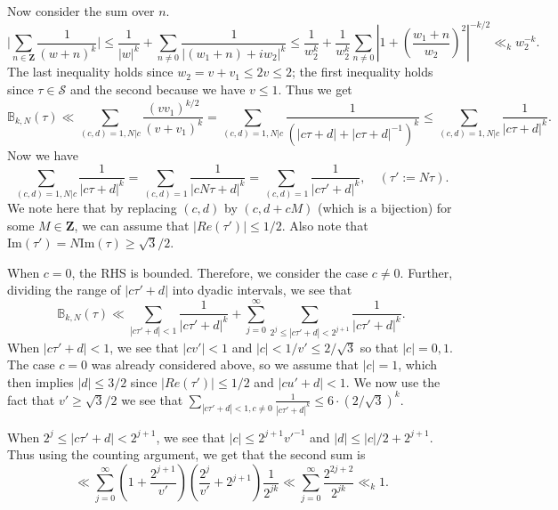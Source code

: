 \documentclass[11pt]{amsart}
\numberwithin{equation}{section}
\theoremstyle{plain}
\theoremstyle{definition}
\newcommand{\mbb}{\mathbb}
\newcommand{\mf}{\mathbf}
\newcommand{\mc}{\mathcal}
\newcommand{\mrm}{\mathrm}
\newcommand{\im}{\mrm{Im}}
\newcommand{\q}{\quad}
\begin{document}
Now consider the sum over $n$.
\begin{equation}
   \big| \sum_{n\in \mf Z} \frac{1}{(w+n)^k} \big|\le \frac{1}{|w|^k}+\sum_{n\neq 0}\frac{1}{|(w_1+n)+iw_2|^k}\le \frac{1}{w_2^k}+\frac{1}{w_2^k}\sum_{n\neq 0}|1+(\frac{w_1+n}{w_2} )^2|^{-k/2}\ll_k w_2^{-k}.
\end{equation}
The last inequality holds since $w_2=v+ v_1\le 2v \le 2$; the first inequality holds since $\tau \in \mc S$ and the second because we have $v \le 1$. Thus we get
\begin{equation} \label{cc-1}
    \mbb B_{k,N}(\tau)\ll \sum_{(c,d)=1, N|c}\frac{(v v_1)^{k/2}}{(v+ v_1)^k}= \sum_{(c,d)=1, N|c}\frac{1}{ (|c\tau+d| + |c\tau+d|^{-1})^k } \le \sum_{(c,d)=1, N|c}\frac{1}{|c\tau+d|^k}.
\end{equation}
Now we have
\begin{equation}
    \sum_{(c,d)=1, N|c}\frac{1}{|c\tau+d|^k}=\sum_{(c,d)=1}\frac{1}{|cN\tau+d|^k}=\sum_{(c,d)=1}\frac{1}{|c\tau'+d|^k}, \q (\tau' := N \tau).
\end{equation}
We note here that by replacing $(c,d)$ by $(c, d+cM)$ (which is a bijection) for some $M\in\mf Z$, we can assume that $|Re(\tau')| \le 1/2$. Also note that $\im (\tau')=N \im (\tau)\ge \sqrt{3}/2$.

When $c=0$, the RHS is bounded. Therefore, we consider the case $c\neq 0$. Further, dividing the range of $|c\tau'+d|$ into dyadic intervals, we see that
\begin{equation}
    \mbb B_{k,N}(\tau)\ll \sum_{|c\tau'+d|< 1}\frac{1}{|c\tau'+d|^k}+\sum_{j=0}^{\infty}\sum_{2^j\le |c\tau'+d| <2^{j+1}}\frac{1}{|c\tau'+d|^k}.
\end{equation}
When $|c\tau'+d|< 1$, we see that $|cv'|<1$ and $|c|<1/v'\le 2/\sqrt{3}$ so that $|c|=0,1$. The case $c=0$ was already considered above, so we assume that $|c|=1$, which then implies $|d| \le 3/2$ since $|Re(\tau')| \le 1/2$ and $|cu'+d|<1$. We now use the fact that $v'\ge \sqrt{3}/2$ we see that
$ \displaystyle \sum_{|c\tau'+d|< 1, c \neq 0}\frac{1}{|c\tau'+d|^k}\le 6 \cdot (2/\sqrt{3})^k$.

When $2^j\le |c\tau'+d| <2^{j+1}$, we see that $|c|\le 2^{j+1}v'^{-1}$ and $|d|\le |c|/2+2^{j+1}$. Thus using the counting argument, we get that the second sum is 
\begin{equation}
    \ll \sum_{j=0}^{\infty} (1+\frac{2^{j+1}}{v'}) (\frac{2^{j}}{v'} + 2^{j+1}) \frac{1}{2^{jk}}\ll \sum_{j=0}^{\infty} \frac{2^{2j+2}}{2^{jk}}\ll_k 1.
\end{equation}
\end{document}
